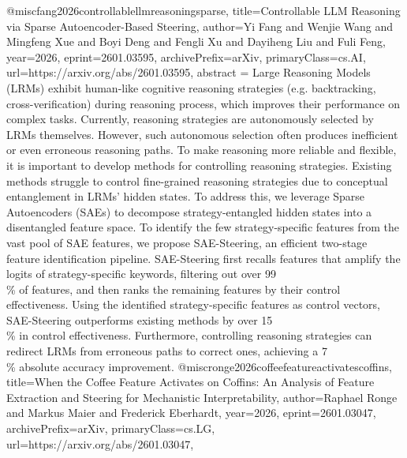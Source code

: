 {}@misc{fang2026controllablellmreasoningsparse,
      title={Controllable LLM Reasoning via Sparse Autoencoder-Based Steering}, 
      author={Yi Fang and Wenjie Wang and Mingfeng Xue and Boyi Deng and Fengli Xu and Dayiheng Liu and Fuli Feng},
      year={2026},
      eprint={2601.03595},
      archivePrefix={arXiv},
      primaryClass={cs.AI},
      url={https://arxiv.org/abs/2601.03595},
      abstract = {Large Reasoning Models (LRMs) exhibit human-like cognitive reasoning strategies (e.g. backtracking, cross-verification) during reasoning process, which improves their performance on complex tasks. Currently, reasoning strategies are autonomously selected by LRMs themselves. However, such autonomous selection often produces inefficient or even erroneous reasoning paths. To make reasoning more reliable and flexible, it is important to develop methods for controlling reasoning strategies. Existing methods struggle to control fine-grained reasoning strategies due to conceptual entanglement in LRMs' hidden states. To address this, we leverage Sparse Autoencoders (SAEs) to decompose strategy-entangled hidden states into a disentangled feature space. To identify the few strategy-specific features from the vast pool of SAE features, we propose SAE-Steering, an efficient two-stage feature identification pipeline. SAE-Steering first recalls features that amplify the logits of strategy-specific keywords, filtering out over 99\\\% of features, and then ranks the remaining features by their control effectiveness. Using the identified strategy-specific features as control vectors, SAE-Steering outperforms existing methods by over 15\\\% in control effectiveness. Furthermore, controlling reasoning strategies can redirect LRMs from erroneous paths to correct ones, achieving a 7\\\% absolute accuracy improvement.}
}@misc{ronge2026coffeefeatureactivatescoffins,
      title={When the Coffee Feature Activates on Coffins: An Analysis of Feature Extraction and Steering for Mechanistic Interpretability}, 
      author={Raphael Ronge and Markus Maier and Frederick Eberhardt},
      year={2026},
      eprint={2601.03047},
      archivePrefix={arXiv},
      primaryClass={cs.LG},
      url={https://arxiv.org/abs/2601.03047},
}
